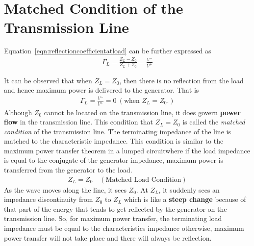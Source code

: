 


\section{Matched Condition of the Transmission Line}\label{lec:lec4}
Equation~\eqref{eqn:reflectioncoefficientatload} can be further expressed as
\begin{align*}
\Gamma_L = \frac{Z_L - Z_0}{Z_L + Z_0} = \frac{V^-}{V^+}
\end{align*}

It can be observed that when $Z_L = Z_0$, then there is no reflection from the load and hence maximum power is delivered to the generator. That is
\begin{align*}
\Gamma_L = \frac{V^-}{V^+} = 0\ (\text{when }Z_L = Z_0.) 
\end{align*}
Although $Z_0$ cannot be located on the transmission line, it does govern\textbf{ power flow} in the transmission line. This condition that $Z_L = Z_0$ is called the \emph{matched condition} of the transmission line. The terminating impedance of the line is matched to the characteristic impedance. This condition is similar to the maximum power transfer theorem in a lumped circuit\textemdash\;where if the load impedance is equal to the conjugate of the generator impedance, maximum power is transferred from the generator to the load.
\begin{align*}
Z_L = Z_0 \quad (\text{Matched Load Condition})
\end{align*}
As the wave moves along the line, it sees $Z_0$. At $Z_L$, it suddenly sees an impedance discontinuity from $Z_0$ to $Z_L$ which is like a \textbf{steep change} because of that part of the energy that tends to get reflected by the generator on the transmission line. So, for maximum power transfer, the terminating load impedance must be equal to the characteristics impedance otherwise, maximum power transfer will not take place and there will always be reflection.

